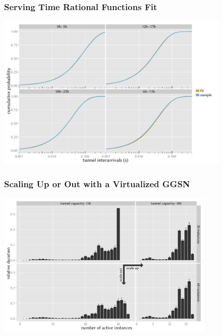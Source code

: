 \documentclass{beamer}
\begin{document}
\begin{frame}
	\frametitle{Serving Time Rational Functions Fit}

	\begin{center}
		\includegraphics[height=7.5cm]{../../chapters/04-mobilenets/images/R-IAT-active-fit-cdf-facets.pdf}
	\end{center}
\end{frame}

\begin{frame}
	\frametitle{Scaling Up or Out with a Virtualized GGSN}
	
	\begin{center}
		\includegraphics[height=7cm]{../../chapters/04-mobilenets/images/R-virtualized-instanceuse-barplot.pdf}
	\end{center}
\end{frame}
\end{document}

